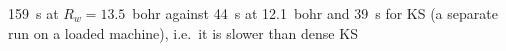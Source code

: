 159~s at $R_w=13.5$~bohr against 44~s at 12.1~bohr and 39~s for KS (a separate run on a loaded machine), i.e.\ it is slower than dense KS